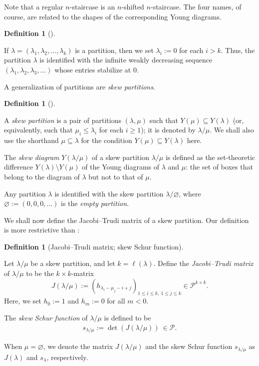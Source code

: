 \documentclass[numbers=enddot,12pt,final,onecolumn,notitlepage]{scrartcl}%
\theoremstyle{definition}
\newtheorem{defi}[theo]{Definition}
\newenvironment{definition}[1][]
{\begin{defi}[#1]\begin{leftbar}}
{\end{leftbar}\end{defi}}
\newcommand{\tup}[1]{\left( #1 \right)}
\renewcommand{\leq}{\leqslant}
\renewcommand{\geq}{\geqslant}
\theoremstyle{plainsl}
\begin{document}
Note that a regular $n$-staircase is an $n$-shifted $n$-staircase.
The four names, of course, are related to the shapes of the corresponding Young diagrams.

\begin{definition}
If $\lambda = \tup{\lambda_1, \lambda_2, \ldots, \lambda_k}$ is
a partition, then we set $\lambda_i := 0$ for each $i > k$.
Thus, the partition $\lambda$ is identified with the infinite
weakly decreasing
sequence $\tup{\lambda_1, \lambda_2, \lambda_3, \ldots}$
whose entries stabilize at $0$.
\end{definition}

A generalization of partitions are \emph{skew partitions}.

\begin{definition}
A \emph{skew partition} is a pair of partitions $(\lambda, \mu)$ such that $Y\tup{\mu} \subseteq Y\tup{\lambda}$ (or, equivalently, such that $\mu_i \leq \lambda_i$ for each $i \geq 1$); it is denoted by $\lambda / \mu$.
We shall also use the shorthand $\mu \subseteq \lambda$ for the condition $Y\tup{\mu} \subseteq Y\tup{\lambda}$ here.

The \emph{skew diagram} $Y\tup{\lambda / \mu}$ of a skew partition $\lambda / \mu$ is defined as the set-theoretic difference $Y\tup{\lambda} \setminus Y\tup{\mu}$ of the Young diagrams of $\lambda$ and $\mu$: the set of boxes that belong to the diagram of $\lambda$ but not to that of $\mu$.

Any partition $\lambda$ is identified with the skew partition $\lambda / \varnothing$, where $\varnothing := \tup{0,0,0,\ldots}$ is the \emph{empty partition}.
\end{definition}

We shall now define the Jacobi--Trudi matrix of a skew partition. Our definition is more restrictive than \cite[Definition 2.3]{Anzis18}:

\begin{definition}[Jacobi--Trudi matrix; skew Schur function]
\label{Jacobi--Trudi Identity}
Let $\lambda / \mu$ be a skew partition, and let $k = \ell\tup{\lambda}$.
Define the \emph{Jacobi--Trudi matrix} of $\lambda/\mu$ to be the $k \times k$-matrix
\[
J(\lambda/\mu) := \tup{ h_{\lambda_i-\mu_j - i + j} }_{1\leq i\leq k,\ 1\leq j\leq k}
\in \mathcal{P}^{k\times k} .
\]
Here, we set $h_0 := 1$ and $h_m := 0$ for all $m < 0$.

The \emph{skew Schur function} of $\lambda/\mu$ is defined to be
\begin{align}
   s_{\lambda/\mu} := \det \tup{ J(\lambda/\mu) } \  \in \mathcal{P} .
\label{eq.def-slm}
\end{align}

When $\mu = \varnothing$, we denote the matrix $J(\lambda/\mu)$ and the skew Schur function $s_{\lambda/\mu}$ as $J(\lambda)$ and $s_\lambda$, respectively.
\end{definition}
\end{document}
